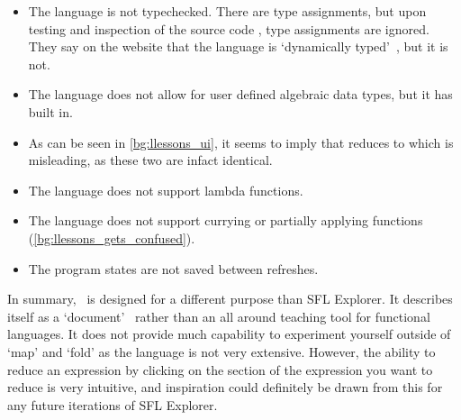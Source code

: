 \begin{itemize}
    \item The language is not typechecked. There are type assignments, but upon testing and inspection of the source code \cite{lambdalessonsgithub}, type assignments are ignored. They say on the website that the language is `dynamically typed'~\cite{lambdalessons}, but it is not. 
    \item The language does not allow for user defined algebraic data types, but it has  built in. 
    \item As can be seen in \ref{bg:llessons_ui}, it seems to imply that  reduces to \sflinline{[x, y]} which is misleading, as these two are infact identical. 
    \item The language does not support lambda functions.
    \item The language does not support currying or partially applying functions (\ref{bg:llessons_gets_confused}).
    \item The program states are not saved between refreshes. 
\end{itemize} 

\noindent In summary, \llessons\ is designed for a different purpose than SFL Explorer. It describes itself as a `document'~\cite{lambdalessons} rather than an all around teaching tool for functional languages. It does not provide much capability to experiment yourself outside of `map' and `fold' as the language is not very extensive. However, the ability to reduce an expression by clicking on the section of the expression you want to reduce is very intuitive, and inspiration could definitely be drawn from this for any future iterations of SFL Explorer. 





